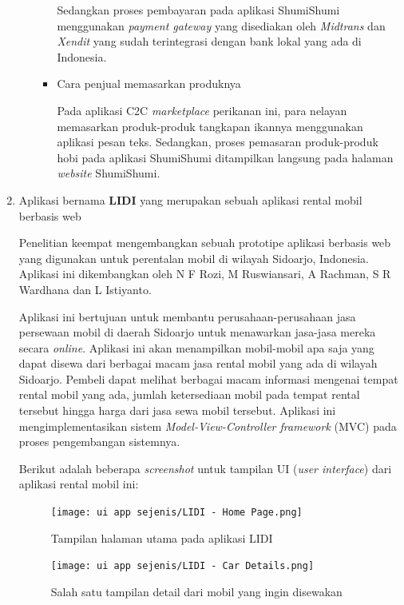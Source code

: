 \documentclass[a4paper]{article}
\begin{document}
\begin{enumerate}
\begin{itemize}
\begin{itemize}
            Sedangkan proses pembayaran pada aplikasi ShumiShumi menggunakan \textit{payment gateway} yang disediakan oleh \textit{Midtrans} dan \textit{Xendit} yang sudah terintegrasi dengan bank lokal yang ada di Indonesia.

            \item Cara penjual memasarkan produknya

            Pada aplikasi C2C \textit{marketplace} perikanan ini, para nelayan memasarkan produk-produk tangkapan ikannya menggunakan aplikasi pesan teks\autocite{c2c-fish-marketplace}. Sedangkan, proses pemasaran produk-produk hobi pada aplikasi ShumiShumi ditampilkan langsung pada halaman \textit{website} ShumiShumi.

        \end{itemize}

    \end{itemize}

    \item Aplikasi bernama \textbf{LIDI} yang merupakan sebuah aplikasi rental mobil berbasis web

    Penelitian keempat mengembangkan sebuah prototipe aplikasi berbasis web yang digunakan untuk perentalan mobil di wilayah Sidoarjo, Indonesia. Aplikasi ini dikembangkan oleh N F Rozi, M Ruswiansari, A Rachman, S R Wardhana dan L Istiyanto\autocite{lidi-car-rental}.

    Aplikasi ini bertujuan untuk membantu perusahaan-perusahaan jasa persewaan mobil di daerah Sidoarjo untuk menawarkan jasa-jasa mereka secara \textit{online}. Aplikasi ini akan menampilkan mobil-mobil apa saja yang dapat disewa dari berbagai macam jasa rental mobil yang ada di wilayah Sidoarjo. Pembeli dapat melihat berbagai macam informasi mengenai tempat rental mobil yang ada, jumlah ketersediaan mobil pada tempat rental tersebut hingga harga dari jasa sewa mobil tersebut. Aplikasi ini mengimplementasikan sistem \textit{Model-View-Controller framework} (MVC) pada proses pengembangan sistemnya\autocite{lidi-car-rental}.

    Berikut adalah beberapa \textit{screenshot} untuk tampilan UI (\textit{user interface}) dari aplikasi rental mobil ini:

    \begin{figure}[h]
        \centering
        \texttt{[image: ui app sejenis/LIDI - Home Page.png]}
        \caption{Tampilan halaman utama pada aplikasi LIDI}
    \end{figure}
    \newpage
    \begin{figure}[h]
        \centering
        \texttt{[image: ui app sejenis/LIDI - Car Details.png]}
        \caption{Salah satu tampilan detail dari mobil yang ingin disewakan}
    \end{figure}


\end{enumerate}
\end{document}
